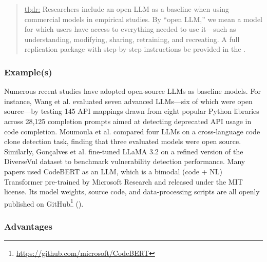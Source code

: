 \begin{quote}
\underline{tl;dr:} Researchers \should include an open LLM as a baseline when using commercial models in empirical studies. By “open LLM,” we mean a model for which users have access to everything needed to use it—such as understanding, modifying, sharing, retraining, and recreating. A full replication package with step-by-step instructions \should be provided in the \supplementarymaterial.
\end{quote}

\subsubsection{Example(s)}

Numerous recent studies have adopted open‐source LLMs as baseline models. For instance, Wang et al. \cite{wang2024and} evaluated seven advanced LLMs—six of which were open source—by testing 145 API mappings drawn from eight popular Python libraries across 28,125 completion prompts aimed at detecting deprecated API usage in code completion. Moumoula et al. \cite{moumoula2024large} compared four LLMs on a cross-language code clone detection task, finding that three evaluated models were open source. Similarly, Gonçalves et al. \cite{gonccalves2025evaluating} fine-tuned LLaMA 3.2 on a refined version of the DiverseVul dataset to benchmark vulnerability detection performance. Many papers \cite{DBLP:journals/jss/YangZCZHC23, DBLP:conf/gaiis/XiaSD24, DBLP:conf/kbse/SonnekalbGBM22, DBLP:conf/icse/CaiYMMN24} used CodeBERT as an LLM, which is a bimodal (code + NL) Transformer pre-trained by Microsoft Research and released under the MIT license. Its model weights, source code, and data-processing scripts are all openly published on GitHub\footnote{\url{https://github.com/microsoft/CodeBERT}} (\modelversion).






\subsubsection{Advantages}

